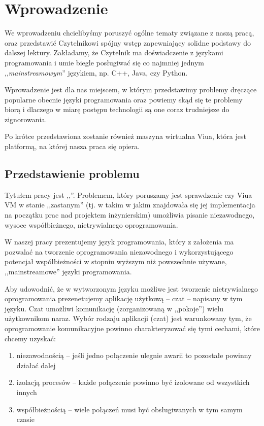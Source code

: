 \chapter{Wprowadzenie}
\label{wprowadzenie}

We wprowadzeniu chcielibyśmy poruszyć ogólne tematy związane z naszą pracą, oraz
przedstawić Czytelnikowi spójny wstęp zapewniający solidne podstawy do dalszej
lektury. Zakładamy, że Czytelnik ma doświadczenie z językami programowania i
umie biegle posługiwać się co najmniej jednym ,,\emph{mainstreamowym}''
językiem, np.  C++, Java, czy Python.

Wprowadzenie jest dla nas miejscem, w którym przedstawimy problemy dręczące
popularne obecnie języki programowania oraz powiemy skąd się te problemy biorą i
dlaczego w miarę postępu technologii są one coraz trudniejsze do zignorowania.

Po krótce przedstawiona zostanie również maszyna wirtualna Viua, która jest
platformą, na której nasza praca się opiera.

\section{Przedstawienie problemu}

Tytułem pracy jest ,,\inzmaintitlePL''. Problemem, który poruszamy jest
sprawdzenie czy Viua VM w stanie ,,zastanym'' (tj. w takim w jakim znajdowała
się jej implementacja na początku prac nad projektem inżynierskim) umożliwia
pisanie niezawodnego, wysoce współbieżnego, nietrywialnego oprogramowania.

W naszej pracy prezentujemy język programowania, który z założenia ma pozwalać
na tworzenie oprogramowania niezawodnego i wykorzystującego potencjał
współbieżności w stopniu wyższym niż powszechnie używane, ,,mainstreamowe''
języki programowania.

Aby udowodnić, że w wytworzonym języku możliwe jest tworzenie nietrywialnego
oprogramowania prezenetujemy aplikację użytkową -- czat -- napisany w tym
języku. Czat umożliwi komunikację (zorganizowaną w ,,pokoje'') wielu
użytkownikom naraz. Wybór rodzaju aplikacji (czat) jest warunkowany tym, że
oprogramowanie komunikacyjne powinno charakteryzować się tymi cechami, które
chcemy uzyskać:

\begin{enumerate}
    \item niezawodnością -- jeśli jedno połączenie ulegnie awarii to pozostałe
        powinny działać dalej
    \item izolacją procesów -- każde połączenie powinno być izolowane od
        wszystkich innych
    \item współbieżnością -- wiele połączeń musi być obsługiwanych w tym samym
        czasie
\end{enumerate}

